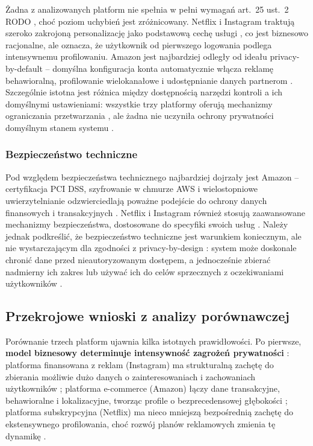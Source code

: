 \documentclass[12pt, a4paper]{article}
\begin{document}
Żadna z analizowanych platform nie spełnia w pełni wymagań art.~25 ust.~2 RODO \cite{rodo, edpb2019}, choć poziom uchybień jest zróżnicowany. Netflix i Instagram traktują szeroko zakrojoną personalizację jako podstawową cechę usługi \cite{netflix_recs, ig_ranking}, co jest biznesowo racjonalne, ale oznacza, że użytkownik od pierwszego logowania podlega intensywnemu profilowaniu. Amazon jest najbardziej odległy od ideału privacy-by-default -- domyślna konfiguracja konta automatycznie włącza reklamę behawioralną, profilowanie wielokanałowe i udostępnianie danych partnerom \cite{amazon_privacy, amazon_dsp}. Szczególnie istotna jest różnica między dostępnością narzędzi kontroli a ich domyślnymi ustawieniami: wszystkie trzy platformy oferują mechanizmy ograniczania przetwarzania \cite{netflix_stop, ig_reset, amazon_privacy}, ale żadna nie uczyniła ochrony prywatności domyślnym stanem systemu \cite{edpb2019}.

\subsubsection{Bezpieczeństwo techniczne}

Pod względem bezpieczeństwa technicznego najbardziej dojrzały jest Amazon -- certyfikacja PCI DSS, szyfrowanie w chmurze AWS i wielostopniowe uwierzytelnianie odzwierciedlają poważne podejście do ochrony danych finansowych i transakcyjnych \cite{amazon_privacy}. Netflix i Instagram również stosują zaawansowane mechanizmy bezpieczeństwa, dostosowane do specyfiki swoich usług \cite{netflix_privacy, meta_privacy}. Należy jednak podkreślić, że bezpieczeństwo techniczne jest warunkiem koniecznym, ale nie wystarczającym dla zgodności z privacy-by-design \cite{edpb2019}: system może doskonale chronić dane przed nieautoryzowanym dostępem, a jednocześnie zbierać nadmierny ich zakres lub używać ich do celów sprzecznych z oczekiwaniami użytkowników \cite{himeur2022}.

\subsection{Przekrojowe wnioski z analizy porównawczej}

Porównanie trzech platform ujawnia kilka istotnych prawidłowości. Po pierwsze, \textbf{model biznesowy determinuje intensywność zagrożeń prywatności} \cite{chen2025}: platforma finansowana z reklam (Instagram) ma strukturalną zachętę do zbierania możliwie dużo danych o zainteresowaniach i zachowaniach użytkowników \cite{meta_privacy}; platforma e-commerce (Amazon) łączy dane transakcyjne, behawioralne i lokalizacyjne, tworząc profile o bezprecedensowej głębokości \cite{amazon_privacy}; platforma subskrypcyjna (Netflix) ma nieco mniejszą bezpośrednią zachętę do ekstensywnego profilowania, choć rozwój planów reklamowych zmienia tę dynamikę \cite{netflix_privacy}.
\end{document}
